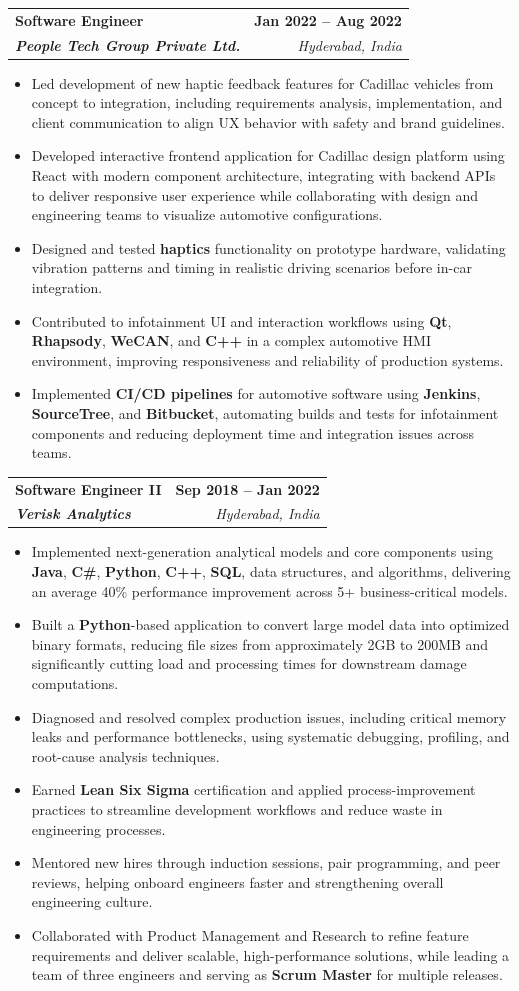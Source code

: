 \documentclass[letterpaper,11pt]{article}
\makeatletter
\newcommand{\resumeItem}[1]{
  \item\small{
    {#1 \vspace{-2pt}}
  }
}
\newcommand{\resumeSubheading}[4]{
  \vspace{-2pt}\item
    \begin{tabular*}{1.0\textwidth}[t]{l@{\extracolsep{\fill}}r}
      \textbf{#1} & \textbf{\small #2} \\
      \textit{\small#3} & \textit{\small #4} \\
    \end{tabular*}\vspace{-7pt}
}
\newcommand{\resumeItemListStart}{\begin{itemize}}
\newcommand{\resumeItemListEnd}{\end{itemize}\vspace{-5pt}}
\makeatother
\begin{document}
    \resumeSubheading
      {\textbf{Software Engineer}}{\textbf{Jan 2022 -- Aug 2022}}
      {\textbf{People Tech Group Private Ltd.}}{Hyderabad, India}
      \resumeItemListStart
        \resumeItem{Led development of new haptic feedback features for Cadillac vehicles from concept to integration, including requirements analysis, implementation, and client communication to align UX behavior with safety and brand guidelines.}
        \resumeItem{Developed interactive frontend application for Cadillac design platform using React with modern component architecture, integrating with backend APIs to deliver responsive user experience while collaborating with design and engineering teams to visualize automotive configurations.}
        \resumeItem{Designed and tested \textbf{haptics} functionality on prototype hardware, validating vibration patterns and timing in realistic driving scenarios before in-car integration.}
        \resumeItem{Contributed to infotainment UI and interaction workflows using \textbf{Qt}, \textbf{Rhapsody}, \textbf{WeCAN}, and \textbf{C++} in a complex automotive HMI environment, improving responsiveness and reliability of production systems.}
        \resumeItem{Implemented \textbf{CI/CD pipelines} for automotive software using \textbf{Jenkins}, \textbf{SourceTree}, and \textbf{Bitbucket}, automating builds and tests for infotainment components and reducing deployment time and integration issues across teams.}
      \resumeItemListEnd

    \resumeSubheading
      {\textbf{Software Engineer II}}{\textbf{Sep 2018 -- Jan 2022}}
      {\textbf{Verisk Analytics}}{Hyderabad, India}
      \resumeItemListStart
        \resumeItem{Implemented next-generation analytical models and core components using \textbf{Java}, \textbf{C\#}, \textbf{Python}, \textbf{C++}, \textbf{SQL}, data structures, and algorithms, delivering an average 40\% performance improvement across 5+ business-critical models.}
        \resumeItem{Built a \textbf{Python}-based application to convert large model data into optimized binary formats, reducing file sizes from approximately 2GB to 200MB and significantly cutting load and processing times for downstream damage computations.}
        \resumeItem{Diagnosed and resolved complex production issues, including critical memory leaks and performance bottlenecks, using systematic debugging, profiling, and root-cause analysis techniques.}
        \resumeItem{Earned \textbf{Lean Six Sigma} certification and applied process-improvement practices to streamline development workflows and reduce waste in engineering processes.}
        \resumeItem{Mentored new hires through induction sessions, pair programming, and peer reviews, helping onboard engineers faster and strengthening overall engineering culture.}
        \resumeItem{Collaborated with Product Management and Research to refine feature requirements and deliver scalable, high-performance solutions, while leading a team of three engineers and serving as \textbf{Scrum Master} for multiple releases.}
      \resumeItemListEnd
\end{document}

